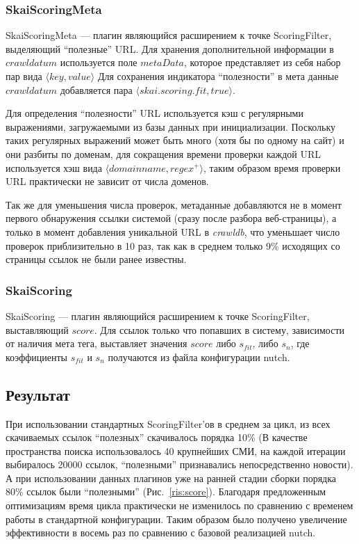 \subsubsection*{SkaiScoringMeta}
\label{sec:scoringmeta}
SkaiScoringMeta --- плагин являющийся расширением к точке ScoringFilter, выделяющий ``полезные'' URL. Для хранения дополнительной информации в $crawldatum$ используется поле $metaData$, которое представляет из себя набор пар вида $\langle key, value\rangle$
Для сохранения индикатора ``полезности'' в мета данные $crawldatum$ добавляется пара $\langle skai.scoring.fit, true\rangle$.

Для определения ``полезности'' URL используется кэш с регулярными выражениями, загружаемыми из базы данных при инициализации. Поскольку таких регулярных выражений может быть много (хотя бы по одному на сайт) и они разбиты по доменам, для сокращения времени проверки каждой URL используется хэш вида $\langle domainname, regex^{+}\rangle$, таким образом время проверки URL практически не зависит от числа доменов.

Так же для уменьшения числа проверок, метаданные добавляются не в момент первого обнаружения ссылки системой (сразу после разбора веб-страницы), а только в момент добавления уникальной URL в \textit{crawldb}, что уменьшает число проверок приблизительно в 10 раз, так как в среднем только 9\% исходящих со страницы ссылок не были ранее известны.
\subsubsection*{SkaiScoring}
SkaiScoring --- плагин являющийся расширением к точке ScoringFilter, выставляющий $score$. Для ссылок только что попавших в систему, зависимости от наличия мета тега, выставляет значения $score$ либо $s_{fit}$, либо $s_{n}$, где коэффициенты $s_{fit}$ и $s_{n}$ получаются из файла конфигурации nutch.
\subsection{Результат}
При использовании стандартных ScoringFilter'ов в среднем за цикл, из всех скачиваемых ссылок ``полезных'' скачивалось порядка 10\% (В качестве пространства поиска использовалось 40 крупнейших СМИ, на каждой итерации выбиралось 20000 ссылок, ``полезными'' признавались непосредственно новости). А при использовании данных плагинов уже на ранней стадии сборки порядка 80\% ссылок были ``полезными'' (Рис.~\ref{ris:score}). Благодаря предложенным оптимизациям время цикла практически не изменилось по сравнению с временем работы в стандартной конфигурации. Таким образом было получено увеличение эффективности в восемь раз по сравнению с базовой реализацией nutch.

